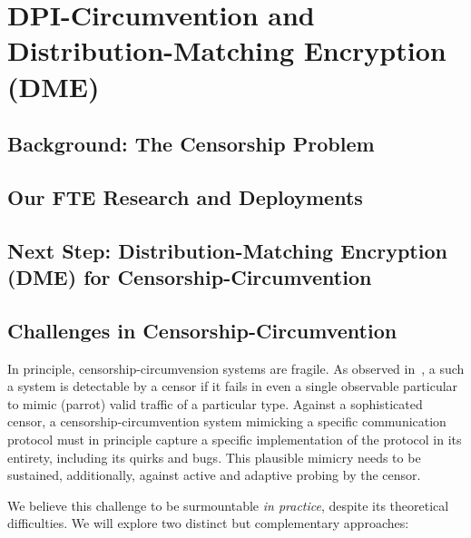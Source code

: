 \documentclass[10pt]{article}
\begin{document}
\section{DPI-Circumvention and Distribution-Matching Encryption (DME)}
\subsection{Background: The Censorship Problem}
\subsection{Our FTE Research and Deployments}
\subsection{Next Step: Distribution-Matching Encryption (DME) for Censorship-Circumvention}

\subsection{Challenges in Censorship-Circumvention}
In principle, censorship-circumvension systems are fragile. As observed in~\cite{ParrotIsDead}, a such a system is detectable by a censor if it fails in even a single observable particular to mimic (parrot) valid traffic of a particular type. Against a sophisticated censor, a censorship-circumvention system mimicking a specific communication protocol must in principle capture a specific implementation of the protocol in its entirety, including its quirks and bugs. This plausible mimicry needs to be sustained, additionally, against active and adaptive probing by the censor.

We believe this challenge to be surmountable {\em in practice}, despite its theoretical difficulties. We will explore two distinct but complementary approaches:
\end{document}
